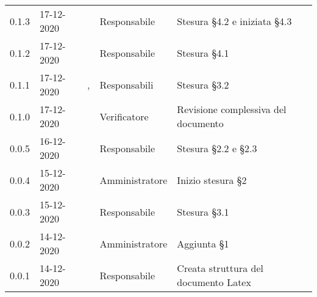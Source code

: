 {{\begin{longtable}{C{1.7cm} C{2.5cm} C{3.2cm} C{2.7cm} C{4.8cm}}
0.1.3 & 17-12-2020 & \BM{} & Responsabile & Stesura \S 4.2 e iniziata \S 4.3 \\

0.1.2 & 17-12-2020 & \SG{} & Responsabile & Stesura \S 4.1 \\

0.1.1 & 17-12-2020 & \SG{},\newline \BM{} & Responsabili & Stesura \S 3.2 \\

0.1.0 & 17-12-2020 & \ZM{} & Verificatore & Revisione complessiva del documento \\

0.0.5 & 16-12-2020 & \BM{} & Responsabile & Stesura \S 2.2 e \S 2.3 \\
		
0.0.4 & 15-12-2020 & \PA{} & Amministratore & Inizio stesura \S 2 \\

0.0.3 & 15-12-2020 & \SG{} & Responsabile & Stesura \S 3.1 \\

0.0.2 & 14-12-2020 & \PA{} & Amministratore & Aggiunta \S 1 \\

0.0.1 & 14-12-2020 & \SG{} & Responsabile & Creata struttura del documento Latex \\
		
\end{longtable}
}
}
